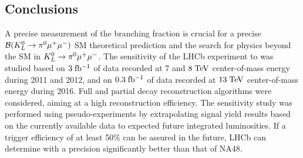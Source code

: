 
\subsection{Conclusions}
\label{subsec:conclusions}
A precise measurement of the \Kspizmm branching fraction is crucial for a precise ${\cal B}(K^{0}_{L}\to\pi^{0}\mu^{+}\mu^{-})$ SM theoretical prediction and the search for physics beyond the SM in ${K^{0}_{L}}\to\pi^{0}\mu^{+}\mu^{-}$.
The sensitivity of the LHCb experiment to \BRof\Kspizmm was studied based on $3\;\rm fb^{-1}$ of data recorded at 7 and $8\;\rm TeV$ center-of-mass energy during 2011 and 2012, and on $0.3\;\rm fb^{-1}$ 
of data recorded at $13\;\rm TeV$ center-of-mass energy during 2016. Full and partial decay reconstruction algorithms were considered, aiming at 
a high reconstruction efficiency. The sensitivity study was performed using pseudo-experiments by extrapolating signal yield results based on the currently available data to expected future integrated luminosities.
If a trigger efficiency of at least 50\% can be assured in the future, LHCb can determine \BRof\Kspizmm with a precision significantly better than that of NA48.
